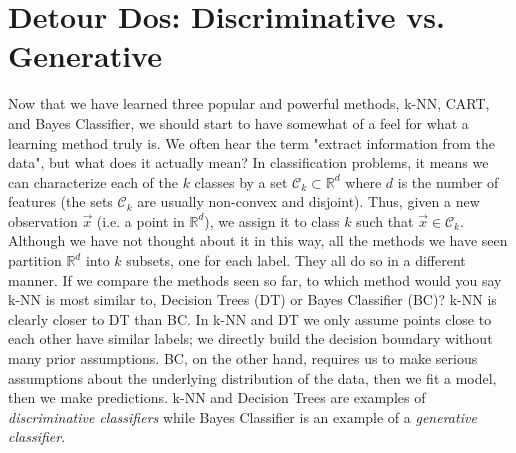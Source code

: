 \documentclass[10pt]{article}
\begin{document}
\section{Detour Dos: Discriminative vs. Generative}
	Now that we have learned three popular and powerful methods, k-NN, CART, and Bayes Classifier, 
	we should start to have somewhat of a feel for what a learning method truly is. We often hear the term 
	"extract information from the data", but what does it actually mean? In classification problems, it means 
	we can characterize each of the $k$ classes by a set $\mathcal C_k \subset \mathbb{R}^d$ where $d$ 
	is the number of features (the sets $\mathcal C_k$ are usually non-convex and disjoint). Thus, given a
	new observation $\vec x$ (i.e. a point in $\mathbb{R}^d$), we assign it to class $k$ such that 
	$\vec x \in \mathcal C_k$. Although we have not thought about it in this way, all the methods we have
	 seen partition $\mathbb{R}^d$ into $k$ subsets, one for each label. They all do so in a different manner.
	 If we compare the methods seen so far, to which method would you say k-NN is most similar to, Decision 
	 Trees (DT) or Bayes Classifier (BC)? k-NN is clearly closer to DT than BC. In k-NN and DT we only 
	 assume points close to each other have similar labels; we directly build the decision boundary without
	 many prior assumptions. BC, on the other hand, requires us to make serious assumptions about the 
	 underlying distribution of the data, then we fit a model, then we make predictions. k-NN and Decision
	 Trees are examples of \textit{discriminative classifiers} while Bayes Classifier is an example of a
	 \textit{generative classifier}. 
	








		
\end{document}
